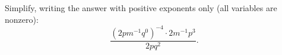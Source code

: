 Simplify, writing the answer with positive exponents only (all variables are nonzero):
\[
\dfrac{(2pm^{-1}q^0)^{-4}\cdot 2m^{-1}p^3}{2pq^2}.
\]
